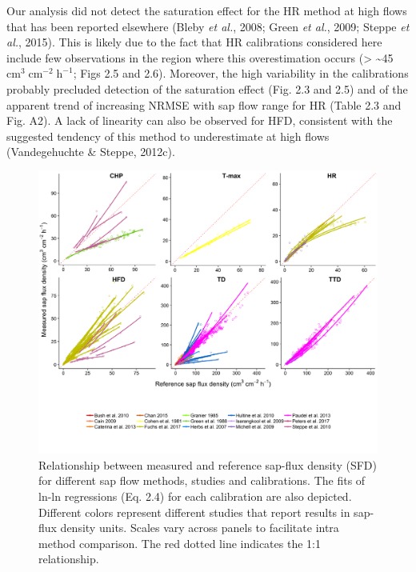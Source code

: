 \documentclass[11pt,twoside]{reedthesis}
\begin{document}
Our analysis did not detect the saturation effect for the HR method at
high flows that has been reported elsewhere (Bleby \emph{et al.}, 2008;
Green \emph{et al.}, 2009; Steppe \emph{et al.}, 2015). This is likely
due to the fact that HR calibrations considered here include few
observations in the region where this overestimation occurs
(\textgreater{} \textasciitilde{}45
\(\text{cm}^3\; \text{cm}^{-2}\; \text{h}^{-1}\); Figs 2.5 and 2.6).
Moreover, the high variability in the calibrations probably precluded
detection of the saturation effect (Fig. 2.3 and 2.5) and of the
apparent trend of increasing NRMSE with sap flow range for HR (Table 2.3
and Fig. A2). A lack of linearity can also be observed for HFD,
consistent with the suggested tendency of this method to underestimate
at high flows (Vandegehuchte \& Steppe, 2012c).\par
\begin{figure}[p]

{\centering \includegraphics[width=1\linewidth]{figure/CH2/figure-density} 

}

\caption[Relationship between measured and reference sap-flux density (SFD) for different sap flow methods, studies and calibrations.]{Relationship between measured and reference sap-flux density (SFD) for different sap flow methods, studies and calibrations. The fits of ln-ln regressions (Eq. 2.4) for each calibration are also depicted. Different colors represent different studies that report results in sap-flux density units. Scales vary across panels to facilitate intra method comparison. The red dotted line indicates the 1:1 relationship.}\label{fig:ch2fig5}
\end{figure}
\end{document}
